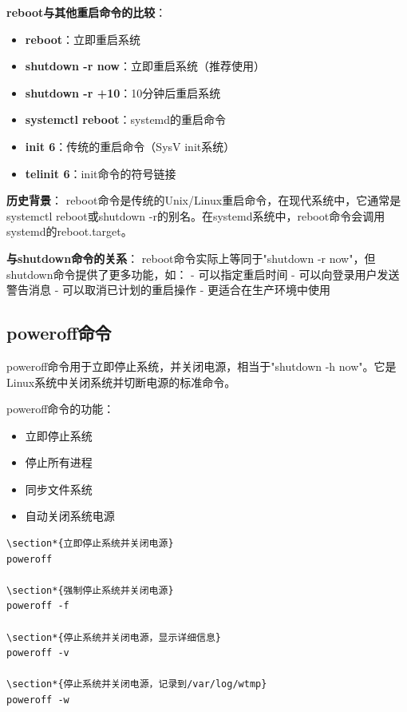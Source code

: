 \documentclass[12pt,UTF8]{ctexbook}
\begin{document}
\textbf{reboot与其他重启命令的比较}：
\begin{itemize}
    \item \textbf{reboot}：立即重启系统
    \item \textbf{shutdown -r now}：立即重启系统（推荐使用）
    \item \textbf{shutdown -r +10}：10分钟后重启系统
    \item \textbf{systemctl reboot}：systemd的重启命令
    \item \textbf{init 6}：传统的重启命令（SysV init系统）
    \item \textbf{telinit 6}：init命令的符号链接
\end{itemize}

\textbf{历史背景}：
reboot命令是传统的Unix/Linux重启命令，在现代系统中，它通常是systemctl reboot或shutdown -r的别名。在systemd系统中，reboot命令会调用systemd的reboot.target。

\textbf{与shutdown命令的关系}：
reboot命令实际上等同于"shutdown -r now"，但shutdown命令提供了更多功能，如：
- 可以指定重启时间
- 可以向登录用户发送警告消息
- 可以取消已计划的重启操作
- 更适合在生产环境中使用

\subsection{poweroff命令}
poweroff命令用于立即停止系统，并关闭电源，相当于"shutdown -h now"。它是Linux系统中关闭系统并切断电源的标准命令。

poweroff命令的功能：
\begin{itemize}
    \item 立即停止系统
    \item 停止所有进程
    \item 同步文件系统
    \item 自动关闭系统电源
\end{itemize}

\begin{verbatim}
\section*{立即停止系统并关闭电源}
poweroff

\section*{强制停止系统并关闭电源}
poweroff -f

\section*{停止系统并关闭电源，显示详细信息}
poweroff -v

\section*{停止系统并关闭电源，记录到/var/log/wtmp}
poweroff -w
\end{verbatim}
\end{document}

